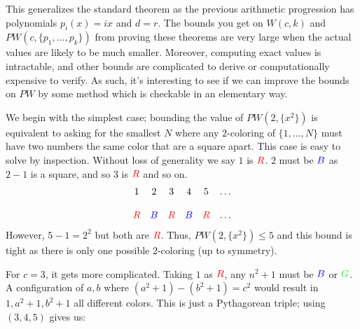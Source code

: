 \documentclass[a4paper]{amsproc}
\theoremstyle{plain}
\theoremstyle{named}
\newcommand{\RR} {\color{red} R}
\newcommand{\BB} {\color{blue} B}
\newcommand{\GG} {\color{green} G}
\begin{document}
This generalizes the standard theorem as the previous arithmetic progression has polynomials $p_i(x) = ix$ and $d=r$.
The bounds you get on $W(c,k)$ and $PW(c,\{p_1,\ldots,p_k\})$ from proving these theorems are very large
when the actual values are likely to be much smaller.
Moreover, computing exact values is intractable, and other bounds are complicated to derive or computationally expensive to verify.
As such, it's interesting to see if we can improve the bounds on $PW$ by some method which is checkable in an elementary way.


We begin with the simplest case; bounding the value of $PW(2,\{x^2\})$ is equivalent to asking for the smallest $N$ where any $2$-coloring of $\{1,\ldots,N\}$ must have two numbers the same color that are a square apart.
This case is easy to solve by inspection.
Without loss of generality we say $1$ is $\RR$.
$2$ must be $\BB$ as $2-1$ is a square, and so $3$ is $\RR$ and so on.
\[\begin{matrix}1&2&3&4&5&\ldots\\\\\RR&\BB&\RR&\BB&\RR&\ldots\end{matrix}\]
However, $5-1=2^2$ but both are $\RR$.
Thus, $PW(2,\{x^2\})\leq 5$ and this bound is tight as there is only one possible $2$-coloring (up to symmetry).

For $c=3$, it gets more complicated.
Taking $1$ as $\RR$, any $n^2+1$ must be $\BB$ or $\GG$.
A configuration of $a,b$ where $(a^2+1)-(b^2+1)=c^2$ would result in $1, a^2+1, b^2+1$ all different colors.
This is just a Pythagorean triple; using $(3,4,5)$ gives us:

\begin{figure}[H]
\caption{}
\label{fig:M0}
\end{figure}
\end{document}
